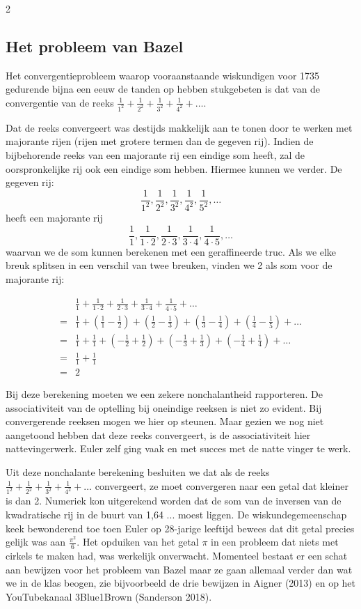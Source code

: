 \begin{multicols}{2}
	\subsection*{Het probleem van Bazel}
	
	Het convergentieprobleem waarop vooraanstaande wiskundigen  voor 1735 gedurende bijna een eeuw de tanden op hebben stukgebeten is dat van de convergentie van de reeks $\frac{1}{1^2}+\frac{1}{2^2}+\frac{1}{3^2}+\frac{1}{4^2}+ \dots $. 
	
	Dat de reeks convergeert was destijds makkelijk aan te tonen door te werken met majorante rijen (rijen met grotere termen dan de gegeven rij). Indien de bijbehorende reeks van een majorante rij een eindige som heeft, zal de oorspronkelijke rij ook een eindige som hebben. Hiermee kunnen we verder. De gegeven rij:
	\[\frac{1}{1^2}, \frac{1}{2^2},\frac{1}{3^2},\frac{1}{4^2},\frac{1}{5^2},\dots\]
	heeft een majorante rij
	\[\frac{1}{1}, \frac{1}{1\cdot 2},\frac{1}{2\cdot 3},\frac{1}{3\cdot 4},\frac{1}{4\cdot 5},\dots\]
	waarvan we de som kunnen berekenen met een geraffineerde truc. Als we elke breuk splitsen in een verschil van twee breuken, vinden we 2 als som voor de majorante rij:
	
	\begin{align*}
		&\frac{1}{1}+\frac{1}{1\cdot 2}+\frac{1}{2\cdot 3}+\frac{1}{3\cdot 4}+\frac{1}{4\cdot 5}+\dots \\
		=&\frac{1}{1}+\left( \frac{1}{1}-\frac{1}{2} \right)+\left( \frac{1}{2}-\frac{1}{3} \right)+\left( \frac{1}{3}-\frac{1}{4} \right)+\left( \frac{1}{4}-\frac{1}{5} \right)+\dots \\
		=&\frac{1}{1}+ \frac{1}{1}+ \left(-\frac{1}{2} + \frac{1}{2}\right) + \left(-\frac{1}{3} + \frac{1}{3} \right) +\left(-\frac{1}{4} + \frac{1}{4}\right)+\dots \\
		=&\frac{1}{1}+\frac{1}{1} \\
		=&2
	\end{align*}
	
	Bij deze berekening moeten we een zekere nonchalantheid rapporteren. De associativiteit van de optelling bij oneindige reeksen is niet zo evident. Bij convergerende reeksen mogen we hier op steunen. Maar gezien we nog niet aangetoond hebben dat deze reeks convergeert, is de associativiteit hier nattevingerwerk. Euler zelf ging vaak en met succes met de natte vinger te werk.
	
	Uit deze nonchalante berekening besluiten we dat als de reeks $\frac{1}{1^2}+\frac{1}{2^2}+\frac{1}{3^2}+\frac{1}{4^2}+ \dots $ convergeert, ze moet convergeren naar een getal dat kleiner is dan 2. Numeriek kon uitgerekend worden dat de som van de inversen van de kwadratische rij in de buurt van 1,64 ... moest liggen. De wiskundegemeenschap keek bewonderend toe toen Euler op 28-jarige leeftijd bewees dat dit getal precies gelijk was aan $\frac{\pi^2}{6}$. Het opduiken van het getal $\pi$ in een probleem dat niets met cirkels te maken had, was werkelijk onverwacht. Momenteel bestaat er een schat aan bewijzen voor het probleem van Bazel maar ze gaan allemaal verder dan wat we in de klas beogen, zie bijvoorbeeld de drie bewijzen in Aigner (2013) en op het YouTubekanaal 3Blue1Brown (Sanderson 2018).
	

\end{multicols}
